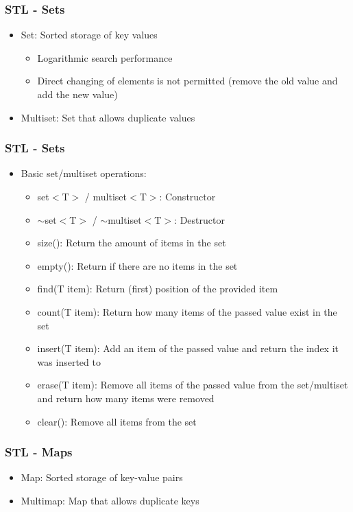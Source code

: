 \begin{frame}\frametitle{STL - Sets}
\begin{itemize}
\item Set: Sorted storage of key values
	\begin{itemize}
	\item Logarithmic search performance
	\item Direct changing of elements is not permitted (remove the old value and add the new value)
	\end{itemize}
\item Multiset: Set that allows duplicate values
\end{itemize}
\end{frame}

\begin{frame}\frametitle{STL - Sets}
\begin{itemize}
\item Basic set/multiset operations:
	\begin{itemize}
	\item set$<$T$>$ / multiset$<$T$>$: Constructor
	\item $\sim$set$<$T$>$ / $\sim$multiset$<$T$>$: Destructor
	\item size(): Return the amount of items in the set
	\item empty(): Return if there are no items in the set
	\item find(T item): Return (first) position of the provided item
	\item count(T item): Return how many items of the passed value exist in the set
	\item insert(T item): Add an item of the passed value and return the index it was inserted to
	\item erase(T item): Remove all items of the passed value from the set/multiset and return how many items were removed
	\item clear(): Remove all items from the set
	\end{itemize}
\end{itemize}
\end{frame}

\begin{frame}\frametitle{STL - Maps}
\begin{itemize}
\item Map: Sorted storage of key-value pairs
\item Multimap: Map that allows duplicate keys
\end{itemize}
\end{frame}

